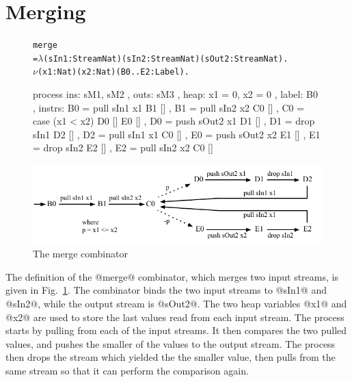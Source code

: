 \section{Merging}
\begin{figure}
\begin{alltt}
               merge
                 = \(\lambda\) (sIn1: Stream Nat) (sIn2: Stream Nat) (sOut2: Stream Nat). 
                   \(\nu\) (x1: Nat) (x2: Nat) (B0..E2: Label).
\end{alltt}
\begin{code}
                   process
                    { ins:    { sM1, sM2 }
                    , outs:   { sM3 }
                    , heap:   { x1 = 0, x2 = 0 }
                    , label:  B0
                    , instrs: { B0 = pull sIn1  x1   B1 []
                              , B1 = pull sIn2  x2   C0 []
                              , C0 = case (x1 < x2)  D0 []  E0 []
                              , D0 = push sOut2 x1   D1 []
                              , D1 = drop sIn1       D2 []
                              , D2 = pull sIn1  x1   C0 []
                              , E0 = push sOut2 x2   E1 []
                              , E1 = drop sIn2       E2 []
                              , E2 = pull sIn2 x2    C0 [] } }
\end{code}

\medskip
\includegraphics[scale=1.1]{copy/03-body/process/figures/state-merge.pdf}
\caption{The merge combinator}
\label{fig:Process:Merge}
\end{figure}

The definition of the @merge@ combinator, which merges two input streams, is given in Fig.~\ref{fig:Process:Merge}. The combinator binds the two input streams to @sIn1@ and @sIn2@, while the output stream is @sOut2@. The two heap variables @x1@ and @x2@ are used to store the last values read from each input stream. The process starts by pulling from each of the input streams. It then compares the two pulled values, and pushes the smaller of the values to the output stream. The process then drops the stream which yielded the the smaller value, then pulls from the same stream so that it can perform the comparison again.

